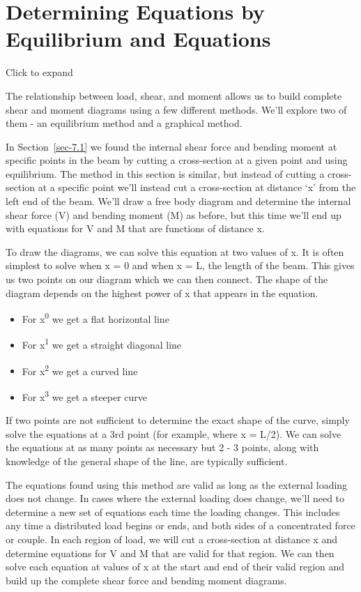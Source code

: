 \documentclass[
  letterpaper,
  DIV=11,
  numbers=noendperiod]{scrreprt}
\theoremstyle{definition}
\theoremstyle{remark}
\begin{document}
\section{Determining Equations by Equilibrium and
Equations}\label{sec-7.3}

Click to expand

The relationship between load, shear, and moment allows us to build
complete shear and moment diagrams using a few different methods. We'll
explore two of them - an equilibrium method and a graphical method.

In Section~\ref{sec-7.1} we found the internal shear force and bending
moment at specific points in the beam by cutting a cross-section at a
given point and using equilibrium. The method in this section is
similar, but instead of cutting a cross-section at a specific point
we'll instead cut a cross-section at distance `x' from the left end of
the beam. We'll draw a free body diagram and determine the internal
shear force (V) and bending moment (M) as before, but this time we'll
end up with equations for V and M that are functions of distance x.

To draw the diagrams, we can solve this equation at two values of x. It
is often simplest to solve when x = 0 and when x = L, the length of the
beam. This gives us two points on our diagram which we can then connect.
The shape of the diagram depends on the highest power of x that appears
in the equation.

\begin{itemize}
\item
  For x\textsuperscript{0} we get a flat horizontal line
\item
  For x\textsuperscript{1} we get a straight diagonal line
\item
  For x\textsuperscript{2} we get a curved line
\item
  For x\textsuperscript{3} we get a steeper curve
\end{itemize}

If two points are not sufficient to determine the exact shape of the
curve, simply solve the equations at a 3rd point (for example, where x =
L/2). We can solve the equations at as many points as necessary but 2 -
3 points, along with knowledge of the general shape of the line, are
typically sufficient.

The equations found using this method are valid as long as the external
loading does not change. In cases where the external loading does
change, we'll need to determine a new set of equations each time the
loading changes. This includes any time a distributed load begins or
ends, and both sides of a concentrated force or couple. In each region
of load, we will cut a cross-section at distance x and determine
equations for V and M that are valid for that region. We can then solve
each equation at values of x at the start and end of their valid region
and build up the complete shear force and bending moment diagrams.
\end{document}
